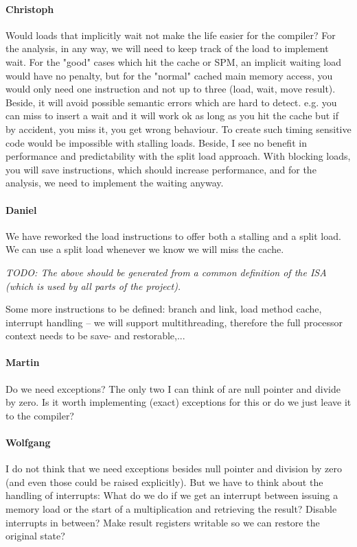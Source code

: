 \documentclass{IEEEtran}
\newcommand{\todo}[1]{{\emph{TODO: #1}}}
\newcommand{\comment}[3]{\paragraph*{\textbf{#1}}{\color{#3}#2}}
\newcommand{\wolf}[1]{\comment{Wolfgang}{#1}{OliveGreen}}
\newcommand{\martin}[1]{\comment{Martin}{#1}{Blue}}
\newcommand{\daniel}[1]{\comment{Daniel}{#1}{RoyalBlue}}
\newcommand{\cullmann}[1]{\comment{Christoph}{#1}{Maroon}}
\begin{document}
\begin{itemize}
\cullmann{
Would loads that implicitly wait not make the life easier for the compiler? For the analysis, in any way, we will need to keep track of the load to implement wait.
For the "good" cases which hit the cache or SPM, an implicit waiting load would have no penalty, but for the "normal" cached main memory access, you would only need one instruction and not up to three (load, wait, move result).
Beside, it will avoid possible semantic errors which are hard to detect. e.g. you can miss to insert a wait and it will work ok as long as you hit the cache but if by accident, you miss it, you get wrong behaviour.
To create such timing sensitive code would be impossible with stalling loads.
Beside, I see no benefit in performance and predictability with the split load approach. With blocking loads, you will save instructions, which should increase performance, and for the analysis, we need to implement the waiting anyway.
}

\daniel{We have reworked the load instructions to offer both a stalling and a split load. We can use a split load whenever we know we will miss the cache.}

%

\end{itemize}

\bigskip

\todo{The above should be generated from a common definition of the ISA (which is used by all parts of the project).}

Some more instructions to be defined: branch and link, load method cache, interrupt handling -- we will support multithreading, therefore the full processor context needs to be save- and restorable,...

\martin{Do we need exceptions? The only two I can think of are null pointer and divide by zero. Is it worth implementing (exact) exceptions for this or do we just leave it to the compiler?}

\wolf{I do not think that we need exceptions besides null pointer and division by zero (and even those could be raised explicitly). But we have to think about the handling of interrupts: What do we do if we get an interrupt between issuing a memory load or the start of a multiplication and retrieving the result? Disable interrupts in between? Make result registers writable so we can restore the original state?}
\end{document}
